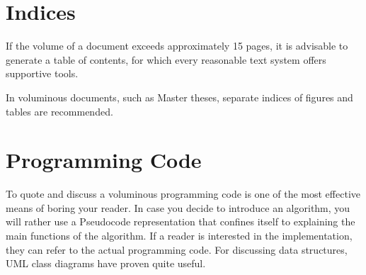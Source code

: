 \begin{quotation}
\end{quotation}

\section{Indices}

If the volume of a document exceeds approximately 15 pages, it is advisable to 
generate a table of contents, for which every reasonable text system offers supportive
tools. 

In voluminous documents, such as Master theses, separate indices of figures and tables
are recommended.


\section{Programming Code}

To quote and discuss a voluminous programming code is one of the most effective means of
boring your reader. In case you decide to introduce an algorithm, you will rather
use a Pseudocode representation that confines itself to explaining the main functions
of the algorithm. If a reader is interested in the implementation, they can refer to
the actual programming code. For discussing data structures, UML class diagrams have proven
quite useful.

